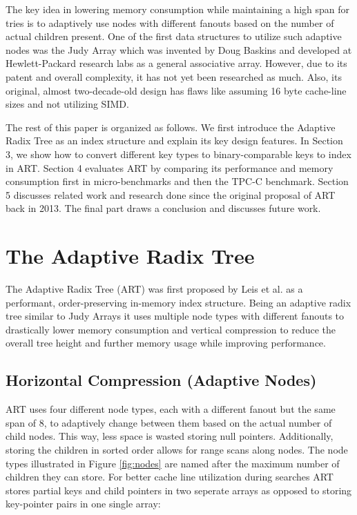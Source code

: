 \documentclass[acmtog, nonacm]{acmart}
\begin{document}
The key idea in lowering memory consumption while maintaining a high span for tries is to adaptively use nodes 
with different fanouts based on the number of actual children present. One of the first data structures to utilize such 
adaptive nodes was the Judy Array \cite{baskins2004judy} which was invented by Doug Baskins and developed at 
Hewlett-Packard research labs as a general associative array. However, due to its patent and overall complexity, 
it has not yet been researched as much. Also, its original, almost two-decade-old design has flaws like assuming 
16 byte cache-line sizes and not utilizing SIMD.

The rest of this paper is organized as follows. We first introduce the Adaptive Radix Tree as an index structure 
and explain its key design features. In Section 3, we show how to convert different key types to binary-comparable keys to 
index in ART. Section 4 evaluates ART by comparing its performance and memory consumption first in 
micro-benchmarks and then the TPC-C benchmark. Section 5 discusses related work and research done since the 
original proposal of ART back in 2013. The final part draws a conclusion and discusses future work.

\section{The Adaptive Radix Tree}
The Adaptive Radix Tree (ART) was first proposed by Leis et al. \cite{6544812} as a performant, order-preserving 
in-memory index structure. Being an adaptive radix tree similar to Judy Arrays it uses multiple node types 
with different fanouts to drastically lower memory consumption and vertical compression to reduce the overall tree 
height and further memory usage while improving performance.

\subsection{Horizontal Compression (Adaptive Nodes)}
ART uses four different node types, each with a different fanout but the same span 
of 8, to adaptively change between them based on the actual number of child nodes. This way, less space is wasted 
storing null pointers. Additionally, storing the children in sorted order allows for range scans along nodes. The node types 
illustrated in Figure \ref{fig:nodes} are named after the maximum number of children 
they can store. For better cache line utilization during searches ART stores partial keys and child pointers in two 
seperate arrays as opposed to storing key-pointer pairs in one single array:
\end{document}
